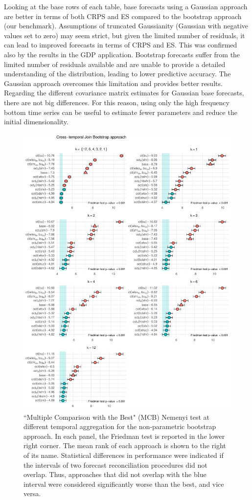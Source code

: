 \documentclass[a4paper,11pt]{article}
\theoremstyle{definition}
\begin{document}
Looking at the base rows of each table, base forecasts using a Gaussian approach are better in terms of both CRPS and ES compared to the bootstrap approach (our benchmark). Assumptions of truncated Gaussianity (Gaussian with negative values set to zero) may seem strict, but given the limited number of residuals, it can lead to improved forecasts in terms of CRPS and ES. This was confirmed also by the results in the GDP application. Bootstrap forecasts suffer from the limited number of residuals available and are unable to provide a detailed understanding of the distribution, leading to lower predictive accuracy. The Gaussian approach overcomes this limitation and provides better results. Regarding the different covariance matrix estimates for Gaussian base forecasts, there are not big differences. For this reason, using only the high frequency bottom time series can be useful to estimate fewer parameters and reduce the initial dimensionality.

\begin{figure}[p]
\centering
\includegraphics[width = 0.95\linewidth]{fig/VN525/ctjb_more.pdf}
\caption{“Multiple Comparison with the Best" (MCB) Nemenyi test at different temporal aggregation for the non-parametric bootstrap approach. In each panel, the Friedman test is reported in the lower right corner. The mean rank of each approach is shown to the right of its name. Statistical differences in performance were indicated if the intervals of two forecast reconciliation procedures did not overlap. Thus, approaches that did not overlap with the blue interval were considered significantly worse than the best, and vice versa.}
\label{fig:vnmcb_ctjb}
\end{figure}
\end{document}

